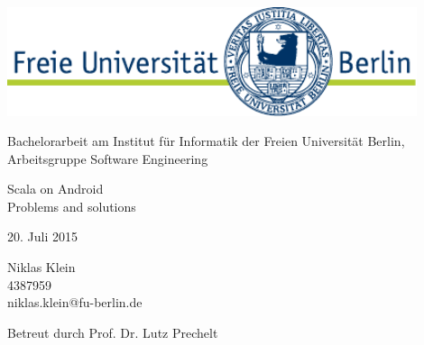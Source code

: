 \begin{titlepage}
\begin{center}

	\includegraphics[width=12cm]{asset/fu-logo.pdf}

	\vspace{1.5cm}

	Bachelorarbeit am Institut für Informatik der Freien Universität Berlin, Arbeitsgruppe Software Engineering

	\vspace{2.5cm}

	\begin{spacing}{1.3}
	\begin{huge}

		Scala on Android\\
		Problems and solutions

	\end{huge}
	\end{spacing}

	\vspace{1.2cm}

	20. Juli 2015

	\vspace{\fill}

	Niklas Klein\\
	4387959\\
	niklas.klein@fu-berlin.de

	\vspace{0.7cm}

	Betreut durch Prof. Dr. Lutz Prechelt

\end{center}
\end{titlepage}